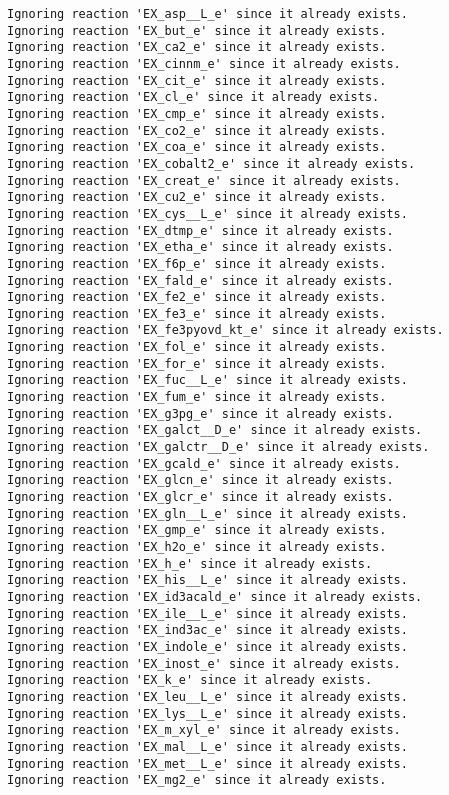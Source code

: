 \documentclass[
  letterpaper,
  DIV=11,
  numbers=noendperiod]{scrartcl}
\begin{document}
\begin{verbatim}
Ignoring reaction 'EX_asp__L_e' since it already exists.
Ignoring reaction 'EX_but_e' since it already exists.
Ignoring reaction 'EX_ca2_e' since it already exists.
Ignoring reaction 'EX_cinnm_e' since it already exists.
Ignoring reaction 'EX_cit_e' since it already exists.
Ignoring reaction 'EX_cl_e' since it already exists.
Ignoring reaction 'EX_cmp_e' since it already exists.
Ignoring reaction 'EX_co2_e' since it already exists.
Ignoring reaction 'EX_coa_e' since it already exists.
Ignoring reaction 'EX_cobalt2_e' since it already exists.
Ignoring reaction 'EX_creat_e' since it already exists.
Ignoring reaction 'EX_cu2_e' since it already exists.
Ignoring reaction 'EX_cys__L_e' since it already exists.
Ignoring reaction 'EX_dtmp_e' since it already exists.
Ignoring reaction 'EX_etha_e' since it already exists.
Ignoring reaction 'EX_f6p_e' since it already exists.
Ignoring reaction 'EX_fald_e' since it already exists.
Ignoring reaction 'EX_fe2_e' since it already exists.
Ignoring reaction 'EX_fe3_e' since it already exists.
Ignoring reaction 'EX_fe3pyovd_kt_e' since it already exists.
Ignoring reaction 'EX_fol_e' since it already exists.
Ignoring reaction 'EX_for_e' since it already exists.
Ignoring reaction 'EX_fuc__L_e' since it already exists.
Ignoring reaction 'EX_fum_e' since it already exists.
Ignoring reaction 'EX_g3pg_e' since it already exists.
Ignoring reaction 'EX_galct__D_e' since it already exists.
Ignoring reaction 'EX_galctr__D_e' since it already exists.
Ignoring reaction 'EX_gcald_e' since it already exists.
Ignoring reaction 'EX_glcn_e' since it already exists.
Ignoring reaction 'EX_glcr_e' since it already exists.
Ignoring reaction 'EX_gln__L_e' since it already exists.
Ignoring reaction 'EX_gmp_e' since it already exists.
Ignoring reaction 'EX_h2o_e' since it already exists.
Ignoring reaction 'EX_h_e' since it already exists.
Ignoring reaction 'EX_his__L_e' since it already exists.
Ignoring reaction 'EX_id3acald_e' since it already exists.
Ignoring reaction 'EX_ile__L_e' since it already exists.
Ignoring reaction 'EX_ind3ac_e' since it already exists.
Ignoring reaction 'EX_indole_e' since it already exists.
Ignoring reaction 'EX_inost_e' since it already exists.
Ignoring reaction 'EX_k_e' since it already exists.
Ignoring reaction 'EX_leu__L_e' since it already exists.
Ignoring reaction 'EX_lys__L_e' since it already exists.
Ignoring reaction 'EX_m_xyl_e' since it already exists.
Ignoring reaction 'EX_mal__L_e' since it already exists.
Ignoring reaction 'EX_met__L_e' since it already exists.
Ignoring reaction 'EX_mg2_e' since it already exists.

\end{verbatim}
\end{document}
